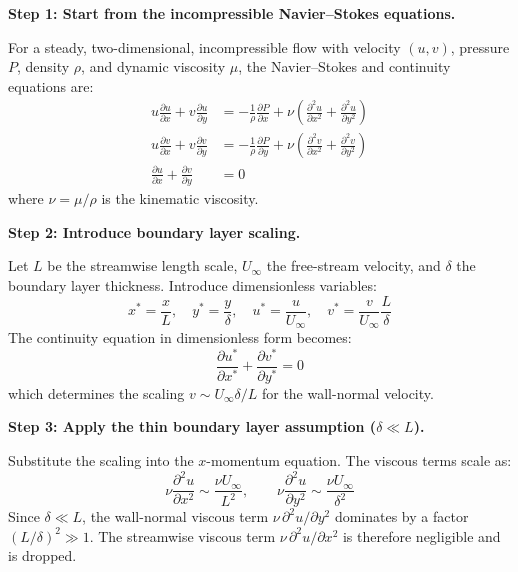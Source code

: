 \textbf{Step 1: Start from the incompressible Navier--Stokes equations.}

For a steady, two-dimensional, incompressible flow with velocity $(u, v)$, pressure $P$, density $\rho$, and dynamic viscosity $\mu$, the Navier--Stokes and continuity equations are:
\begin{align}
u\frac{\partial u}{\partial x} + v\frac{\partial u}{\partial y} &= -\frac{1}{\rho}\frac{\partial P}{\partial x} + \nu\left(\frac{\partial^2 u}{\partial x^2} + \frac{\partial^2 u}{\partial y^2}\right) \\
u\frac{\partial v}{\partial x} + v\frac{\partial v}{\partial y} &= -\frac{1}{\rho}\frac{\partial P}{\partial y} + \nu\left(\frac{\partial^2 v}{\partial x^2} + \frac{\partial^2 v}{\partial y^2}\right) \\
\frac{\partial u}{\partial x} + \frac{\partial v}{\partial y} &= 0
\end{align}
where $\nu = \mu/\rho$ is the kinematic viscosity.

\textbf{Step 2: Introduce boundary layer scaling.}

Let $L$ be the streamwise length scale, $U_\infty$ the free-stream velocity, and $\delta$ the boundary layer thickness. Introduce dimensionless variables:
\begin{equation}
x^* = \frac{x}{L},\quad y^* = \frac{y}{\delta},\quad u^* = \frac{u}{U_\infty},\quad v^* = \frac{v}{U_\infty}\frac{L}{\delta}
\end{equation}
The continuity equation in dimensionless form becomes:
\begin{equation}
\frac{\partial u^*}{\partial x^*} + \frac{\partial v^*}{\partial y^*} = 0
\end{equation}
which determines the scaling $v \sim U_\infty \delta / L$ for the wall-normal velocity.

\textbf{Step 3: Apply the thin boundary layer assumption ($\delta \ll L$).}

Substitute the scaling into the $x$-momentum equation. The viscous terms scale as:
\begin{equation}
\nu\frac{\partial^2 u}{\partial x^2} \sim \frac{\nu U_\infty}{L^2},\qquad \nu\frac{\partial^2 u}{\partial y^2} \sim \frac{\nu U_\infty}{\delta^2}
\end{equation}
Since $\delta \ll L$, the wall-normal viscous term $\nu\,\partial^2 u/\partial y^2$ dominates by a factor $(L/\delta)^2 \gg 1$. The streamwise viscous term $\nu\,\partial^2 u/\partial x^2$ is therefore negligible and is dropped.

